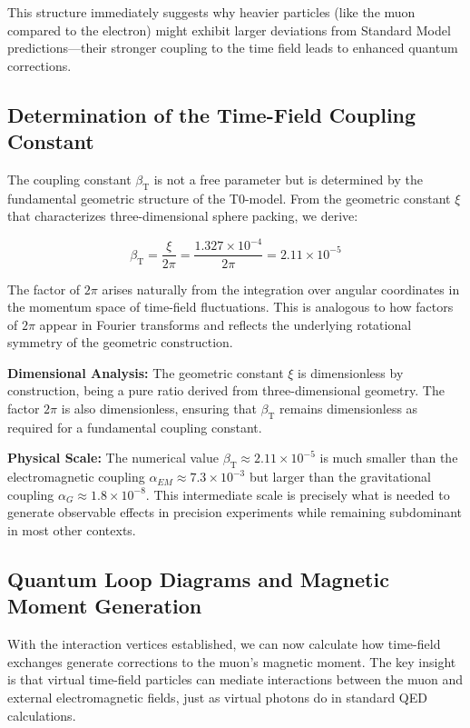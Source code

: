\documentclass[12pt,a4paper]{article}
\newcommand{\betaT}{\beta_{\text{T}}}
\newcommand{\xigeom}{\xi}
\begin{document}
	This structure immediately suggests why heavier particles (like the muon compared to the electron) might exhibit larger deviations from Standard Model predictions—their stronger coupling to the time field leads to enhanced quantum corrections.
	
	\subsection{Determination of the Time-Field Coupling Constant}
	
	The coupling constant $\betaT$ is not a free parameter but is determined by the fundamental geometric structure of the T0-model. From the geometric constant $\xigeom$ that characterizes three-dimensional sphere packing, we derive:
	
	\begin{equation}
		\betaT = \frac{\xigeom}{2\pi} = \frac{1.327 \times 10^{-4}}{2\pi} = 2.11 \times 10^{-5}
	\end{equation}
	
	The factor of $2\pi$ arises naturally from the integration over angular coordinates in the momentum space of time-field fluctuations. This is analogous to how factors of $2\pi$ appear in Fourier transforms and reflects the underlying rotational symmetry of the geometric construction.
	
	\textbf{Dimensional Analysis:} The geometric constant $\xigeom$ is dimensionless by construction, being a pure ratio derived from three-dimensional geometry. The factor $2\pi$ is also dimensionless, ensuring that $\betaT$ remains dimensionless as required for a fundamental coupling constant.
	
	\textbf{Physical Scale:} The numerical value $\betaT \approx 2.11 \times 10^{-5}$ is much smaller than the electromagnetic coupling $\alpha_{EM} \approx 7.3 \times 10^{-3}$ but larger than the gravitational coupling $\alpha_G \approx 1.8 \times 10^{-8}$. This intermediate scale is precisely what is needed to generate observable effects in precision experiments while remaining subdominant in most other contexts.
	
	\subsection{Quantum Loop Diagrams and Magnetic Moment Generation}
	
	With the interaction vertices established, we can now calculate how time-field exchanges generate corrections to the muon's magnetic moment. The key insight is that virtual time-field particles can mediate interactions between the muon and external electromagnetic fields, just as virtual photons do in standard QED calculations.
	
\end{document}
